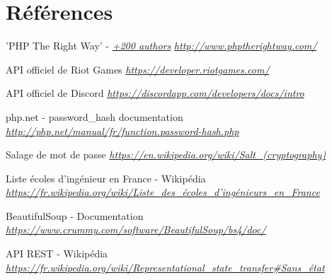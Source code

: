 \documentclass[10pt]{article}
\begin{document}
  \section{Références}
  \begin{thebibliography}{}
    
    \label{phpgoodpratices}
    'PHP The Right Way' - \href{https://github.com/codeguy/php-the-right-way/graphs/contributors}{\textit{+200 authors}} \newline
    \href{http://www.phptherightway.com/}{\textit{http://www.phptherightway.com/}}
    
    \label{riotapi}
    API officiel de Riot Games \newline
    \href{https://developer.riotgames.com/}{\textit{https://developer.riotgames.com/}}
    
    \label{discordapi}
    API officiel de Discord \newline
    \href{https://discordapp.com/developers/docs/intro}{\textit{https://discordapp.com/developers/docs/intro}}
    
    \label{password_hash}
    php.net - password\_hash documentation \newline
    \href{http://php.net/manual/fr/function.password-hash.php}{\textit{http://php.net/manual/fr/function.password-hash.php}}
    
    \label{password_salt}
    Salage de mot de passe \newline
    \href{https://en.wikipedia.org/wiki/Salt_(cryptography)}{\textit{https://en.wikipedia.org/wiki/Salt\_(cryptography)}}
    
    \label{ecole_ingé}
    Liste écoles d'ingénieur en France - Wikipédia \newline
    \href{https://fr.wikipedia.org/wiki/Liste_des_écoles_d'ingénieurs_en_France#Liste_des_207_écoles_françaises_accréditées_au_1er_septembre_2017}{\textit{https://fr.wikipedia.org/wiki/Liste\_des\_écoles\_d'ingénieurs\_en\_France}}
    
    \label{beautifulsoup}
    BeautifulSoup - Documentation\newline
    \href{https://www.crummy.com/software/BeautifulSoup/bs4/doc/}{\textit{https://www.crummy.com/software/BeautifulSoup/bs4/doc/}}
    
    \label{api_rest_session}
    API REST - Wikipédia \newline
    \href{https://fr.wikipedia.org/wiki/Representational_state_transfer#Sans_état}{\textit{https://fr.wikipedia.org/wiki/Representational\_state\_transfer\#Sans\_état}}
    
  \end{thebibliography}
  
\end{document}
